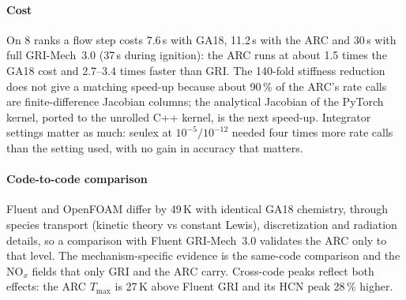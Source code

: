 \documentclass[preprint,review,12pt]{elsarticle}
\begin{document}
\paragraph{Cost}
On 8 ranks a flow step costs 7.6\,s with GA18, 11.2\,s with the ARC and 30\,s with full GRI-Mech~3.0 (37\,s during
ignition): the ARC runs at about 1.5 times the GA18 cost and 2.7--3.4 times faster than GRI. The 140-fold stiffness
reduction does not give a matching speed-up because about 90\,\% of the ARC's rate calls are finite-difference Jacobian
columns; the analytical Jacobian of the PyTorch kernel, ported to the unrolled C++ kernel, is the next speed-up.
Integrator settings matter as much: seulex at $10^{-5}/10^{-12}$ needed four times more rate calls than the setting
used, with no gain in accuracy that matters.

\paragraph{Code-to-code comparison}
Fluent and OpenFOAM differ by 49\,K with identical GA18 chemistry, through species transport (kinetic theory vs
constant Lewis), discretization and radiation details, so a comparison with Fluent GRI-Mech~3.0 validates the ARC only
to that level. The mechanism-specific evidence is the same-code comparison and the NO$_x$ fields that only GRI and the
ARC carry. Cross-code peaks reflect both effects: the ARC $T_{\max}$ is 27\,K above Fluent GRI and its HCN peak
28\,\% higher.
\end{document}
